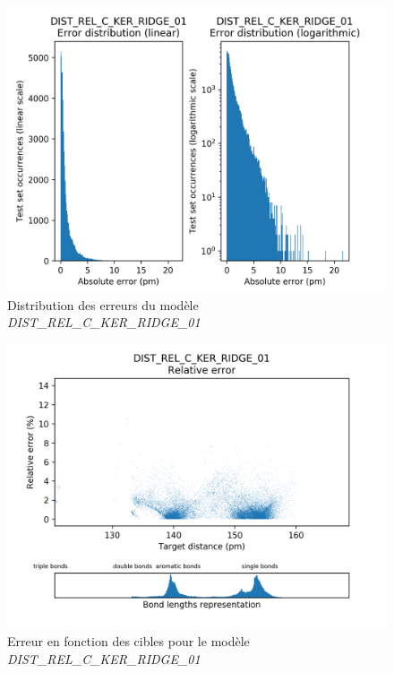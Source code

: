 \begin{figure}
	\centering
	
	\includegraphics[scale=0.8]{../figures/DIST_REL_C_KER_RIDGE_01/DIST_REL_C_KER_RIDGE_01_distrib_rmse_val.png}	
	
	\caption{Distribution des erreurs du modèle \emph{DIST\_REL\_C\_KER\_RIDGE\_01}}
	\label{fdistrib_err_dist_rel_c_ker_ridge_01}
\end{figure}
\begin{figure}
	\centering
	
	\includegraphics[scale=0.8]{../figures/DIST_REL_C_KER_RIDGE_01/DIST_REL_C_KER_RIDGE_01_distrib_rmse_dist.png}	
	
	\caption{Erreur en fonction des cibles pour le modèle \emph{DIST\_REL\_C\_KER\_RIDGE\_01}}
	\label{fdistrib_err_rel_dist_rel_c_ker_ridge_01}
	\end{figure}

